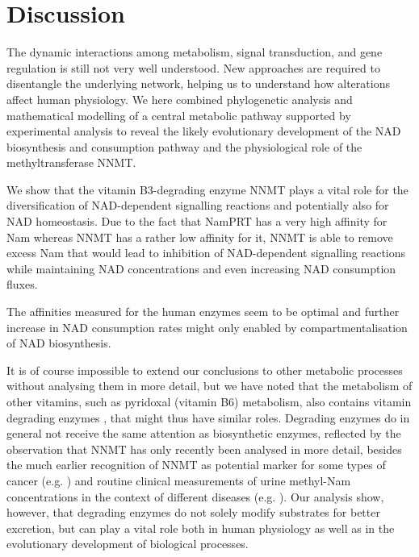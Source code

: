 
\section{Discussion}



The dynamic interactions among metabolism, signal transduction, and gene regulation is still not very well understood. New approaches are required to disentangle the underlying network, helping us to understand how alterations affect human physiology. We here combined phylogenetic analysis and mathematical modelling of a central metabolic pathway supported by experimental analysis to reveal the likely evolutionary development of the NAD biosynthesis and consumption pathway and the physiological role of the methyltransferase NNMT.

We show that the vitamin B3-degrading enzyme NNMT plays a vital role for the diversification of NAD-dependent signalling reactions and potentially also for NAD homeostasis. Due to the fact that NamPRT has a very high affinity for Nam whereas NNMT has a rather low affinity for it, NNMT is able to remove excess Nam that would lead to inhibition of NAD-dependent signalling reactions while maintaining NAD concentrations and even increasing NAD consumption fluxes.

The affinities measured for the human enzymes seem to be optimal and further increase in NAD consumption rates might only enabled by compartmentalisation of NAD biosynthesis.




It is of course impossible to extend our conclusions to other metabolic processes without analysing them in more detail, but we have noted that the metabolism of other vitamins, such as pyridoxal (vitamin B6) metabolism, also contains vitamin degrading enzymes , that might thus have similar roles. Degrading enzymes do in general not receive the same attention as biosynthetic enzymes, reflected by the observation that NNMT has only recently been analysed in more detail, besides the much earlier recognition of NNMT as potential marker for some types of cancer (e.g. \cite{Okamura1998}) and routine clinical measurements of urine methyl-Nam concentrations in the context of different diseases (e.g. \cite{Pumpo2001,Delaney2005}). Our analysis show, however, that degrading enzymes do not solely modify substrates for better excretion, but can play a vital role both in human physiology as well as in the evolutionary development of biological processes.




